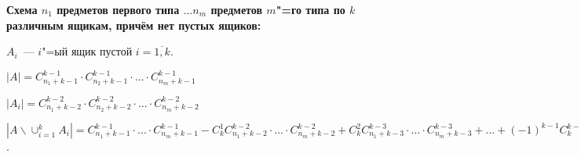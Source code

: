 \textbf{Схема $n_1$ предметов первого типа $\dots n_m$ предметов $m$"=го типа
по $k$ различным ящикам, причём нет пустых ящиков:}
    \smallskip

    $A_i$~--- $i$"=ый ящик пустой $i = \overline{1, k}$.
    \bigskip

    $|A| = C^{k - 1}_{n_1 + k - 1} \cdot C^{k - 1}_{n_2 + k - 1} \cdot \dots
    \cdot C^{k - 1}_{n_m + k - 1}$
    \bigskip

    $|A_i| = C^{k - 2}_{n_1 + k - 2} \cdot C^{k - 2}_{n_2 + k - 2} \cdot \dots
    \cdot C^{k - 2}_{n_m + k - 2}$
    \bigskip

    $|A \backslash \cup^{k}_{i = 1} A_i| = C^{k - 1}_{n_1 + k - 1} \cdot \dots
    \cdot C^{k - 1}_{n_m + k - 1} - C^1_{k} C^{k - 2}_{n_1 + k - 2} \cdot \dots
    \cdot C^{k - 2}_{n_m + k - 2} + C^2_k C^{k - 3}_{n_1 + k - 3} \cdot \dots
    \cdot C^{k - 3}_{n_m + k - 3} + \dots + (-1)^{k - 1} C^{k - 1}_{k} 1^n$.

